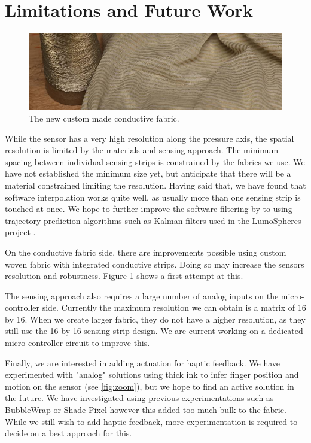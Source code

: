 \documentclass{sigchi-ext}
\begin{document}
\section{Limitations and Future Work}

\begin{figure}[!h]
    \centering
    \includegraphics[width=\columnwidth]{figures/zebra_fabric}
    \caption{The new custom made conductive fabric.}\label{fig:zebra_fabric}
\end{figure}

While the sensor has a very high resolution along the pressure axis, the spatial resolution is limited by the materials and sensing approach. The minimum spacing between individual sensing strips is constrained by the fabrics we use. We have not established the minimum size yet, but anticipate that there will be a material constrained limiting the resolution.
Having said that, we have found that software interpolation works quite well, as usually more than one sensing strip is touched at once. We hope to further improve the software filtering by to using trajectory prediction algorithms such as Kalman filters used in the LumoSpheres project \cite{lumospheres}.

On the conductive fabric side, there are improvements possible using custom woven fabric with integrated conductive strips. Doing so may increase the sensors resolution and robustness. Figure \ref{fig:zebra_fabric} shows a first attempt at this.

The sensing approach also requires a large number of analog inputs on the micro-controller side. Currently the maximum resolution we can obtain is a matrix of 16 by 16. When we create larger fabric, they do not have a higher resolution, as they still use the 16 by 16 sensing strip design. We are current working on a dedicated micro-controller circuit to improve this.

Finally, we are interested in adding actuation for haptic feedback. We have experimented with "analog" solutions using thick ink to infer finger position and motion on the sensor (see \ref{fig:zoom}), but we hope to find an active solution in the future.
We have investigated using previous experimentations such as BubbleWrap \cite{bubblewrap} or Shade Pixel \cite{shadepixel} however this added too much bulk to the fabric. While we still wish to add haptic feedback, more experimentation is required to decide on a best approach for this.
\end{document}
